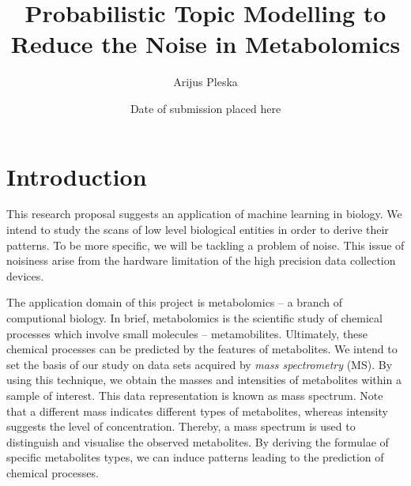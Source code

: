\documentclass{mprop}
\begin{document}
\title{Probabilistic Topic Modelling to Reduce the Noise in Metabolomics}
\author{Arijus Pleska}
\date{Date of submission placed here}
\maketitle

\tableofcontents
\newpage


\section{Introduction}

\par This research proposal suggests an application of machine learning in biology. We intend to study the scans of low level biological entities in order to derive their patterns. To be more specific, we will be tackling a problem of noise. This issue of noisiness arise from the hardware limitation of the high precision data collection devices.   

\par The application domain of this project is metabolomics -- a branch of computional biology. In brief, metabolomics is the scientific study of chemical processes which involve small molecules -- metamobilites. Ultimately, these chemical processes can be predicted by the features of metabolites. We intend to set the basis of our study on data sets acquired by \textit{mass spectrometry} (MS). By using this technique, we obtain the masses and intensities of metabolites within a sample of interest. This data representation is known as mass spectrum. Note that a different mass indicates different types of metabolites, whereas intensity suggests the level of concentration. Thereby, a mass spectrum is used to distinguish and visualise the observed metabolites. By deriving the formulae of specific metabolites types, we can induce patterns leading to the prediction of chemical processes. 
\end{document}
